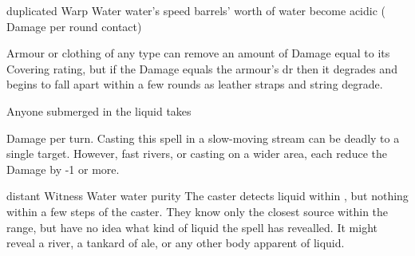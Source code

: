   {duplicated}%
  {Warp}%
  {Water}%
  {water's speed}%
  { barrels' worth of water become acidic ( Damage per round contact)}%
  {
    Armour or clothing of any type can remove an amount of Damage equal to its Covering rating, but if the Damage equals the armour's \gls{dr} then it degrades and begins to fall apart within a few rounds as leather straps and string degrade.

    Anyone submerged in the liquid takes \addtocounter{spellCost}{2}  Damage per turn.
    Casting this spell in a slow-moving stream can be deadly to a single target.
    However, fast rivers, or casting on a wider area, each reduce the Damage by -1 or more.
  }

  {distant}%
  {Witness}%
  {Water}%
  {water purity}%
  {The caster detects liquid within \spellRange, but nothing within a few steps of the caster.
    They know only the closest source within the range, but have no idea what kind of liquid the spell has revealled.}%
  {It might reveal a river, a tankard of ale, or any other body apparent of liquid.}
